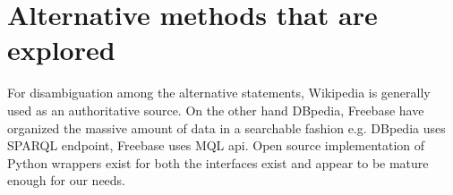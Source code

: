 \documentclass[12pt]{article}
\begin{document}
%
%
%
%
%

\section {Alternative methods that are explored}


%
%

For disambiguation among the alternative statements, Wikipedia is generally used
as an authoritative source. On the other hand DBpedia, Freebase have organized the
massive amount of data in a searchable fashion e.g. DBpedia uses SPARQL endpoint,
Freebase uses MQL api. Open source implementation of Python wrappers exist for
both the interfaces exist and appear to be mature enough for our needs.
\end{document}
